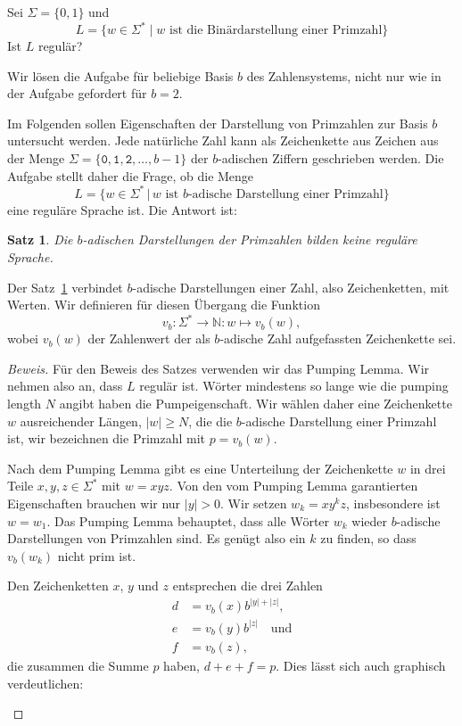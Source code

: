 Sei $\Sigma=\{0,1\}$ und 
\[
L=\{ w\in\Sigma^*\mid \text{$w$ ist die Binärdarstellung einer Primzahl}\}
\]
Ist $L$ regulär?


\begin{loesung}
Wir lösen die Aufgabe für beliebige Basis $b$ des Zahlensystems, nicht
nur wie in der Aufgabe gefordert für $b=2$.

Im Folgenden sollen Eigenschaften der Darstellung von Primzahlen
zur Basis $b$ untersucht werden.
Jede natürliche Zahl kann als Zeichenkette aus Zeichen aus der
Menge $\Sigma=\{\texttt{0},\texttt{1},\texttt{2},\dots, b-1\}$ der $b$-adischen
Ziffern geschrieben werden.
Die Aufgabe stellt daher die Frage, ob die Menge
\[
L=\{ w\in\Sigma^*\,|\,\text{$w$ ist $b$-adische Darstellung einer Primzahl}\}
\]
eine reguläre Sprache ist.
Die Antwort ist:

\newtheorem{satz}{Satz}

\begin{satz}
\label{30000051:satz}
Die $b$-adischen Darstellungen der Primzahlen bilden keine reguläre Sprache.
\end{satz}

Der Satz~\ref{30000051:satz} verbindet $b$-adische Darstellungen einer Zahl,
also Zeichenketten, mit Werten. 
Wir definieren für diesen Übergang die Funktion
\[
v_b\colon \Sigma^*\to \mathbb N:w\mapsto v_b(w),
\]
wobei $v_b(w)$ der Zahlenwert der als $b$-adische Zahl aufgefassten
Zeichenkette sei.

\begin{proof}[Beweis]
Für den Beweis des Satzes verwenden wir das Pumping Lemma.
Wir nehmen also an, dass $L$ regulär ist.
Wörter mindestens so lange wie die pumping length $N$ angibt haben
die Pump\-eigenschaft.
Wir wählen daher eine Zeichenkette $w$ ausreichender Längen, $|w|\ge N$,
die die $b$-adische Darstellung einer Primzahl ist, wir bezeichnen
die Primzahl mit $p=v_b(w)$.

Nach dem Pumping Lemma gibt es eine Unterteilung der Zeichenkette $w$ in
drei Teile $x,y,z\in\Sigma^*$ mit $w=xyz$.
Von den vom Pumping Lemma garantierten Eigenschaften brauchen wir nur
$|y|>0$.
Wir setzen $w_k=xy^kz$, insbesondere ist $w=w_1$.
Das Pumping Lemma behauptet, dass alle Wörter $w_k$ wieder $b$-adische 
Darstellungen von Primzahlen sind.
Es genügt also ein $k$ zu finden, so dass $v_b(w_k)$ nicht prim ist.

Den Zeichenketten $x$, $y$ und $z$ entsprechen die drei Zahlen
\begin{align*}
d&= v_b(x) b^{|y| + |z|},
\\
e&= v_b(y) b^{|z|} \quad\text{und}
\\
f&= v_b(z),
\end{align*}
die zusammen die Summe $p$ haben, $d+e+f=p$.
Dies lässt sich auch graphisch verdeutlichen:
\begin{center}
\def\u{0.5}
\pgfmathparse{1.5*\u}
\xdef\v{\pgfmathresult}
\begin{tikzpicture}[>=latex,thick]


\end{tikzpicture}
\end{center}
\end{proof}
\end{loesung}
